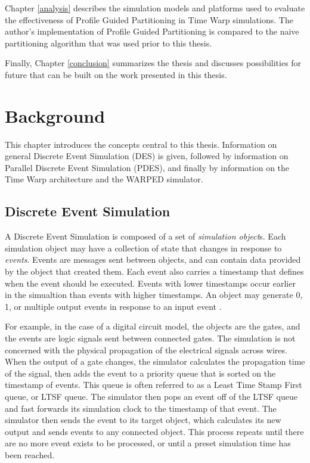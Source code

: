 \documentclass[11pt]{book}
\begin{document}
Chapter \ref{analysis} describes the simulation models and platforms used to evaluate the effectiveness of Profile Guided Partitioning in Time Warp simulations. The author's implementation of Profile Guided Partitioning is compared to the naive partitioning algorithm that was used prior to this thesis.

Finally, Chapter \ref{conclusion} summarizes the thesis and discusses possibilities for future that can be built on the work presented in this thesis.

\chapter{Background}\label{background}

This chapter introduces the concepts central to this thesis. Information on general Discrete Event Simulation (DES) is given, followed by information on Parallel Discrete Event Simulation (PDES), and finally by information on the Time Warp architecture and the WARPED simulator.

\section{Discrete Event Simulation}

A Discrete Event Simulation is composed of a set of \emph{simulation object}s. Each simulation object may have a collection of state that changes in response to \emph{events}. Events are messages sent between objects, and can contain data provided by the object that created them. Each event also carries a timestamp that defines when the event should be executed. Events with lower timestamps occur earlier in the simualtion than events with higher timestamps. An object may generate 0, 1, or multiple output events in response to an input event \cite{law-00}.  

For example, in the case of a digital circuit model, the objects are the gates, and the events are logic signals sent between connected gates. The simulation is not concerned with the physical propagation of the electrical signals across wires. When the output of a gate changes, the simulator calculates the propagation time of the signal, then adds the event to a priority queue that is sorted on the timestamp of events. This queue is often referred to as a Least Time Stamp First queue, or LTSF queue. The simulator then pops an event off of the LTSF queue and fast forwards its simulation clock to the timestamp of that event. The simulator then sends the event to its target object, which calculates its new output and sends events to any connected object. This process repeats until there are no more event exists to be processed, or until a preset simulation time has been reached.
\end{document}
